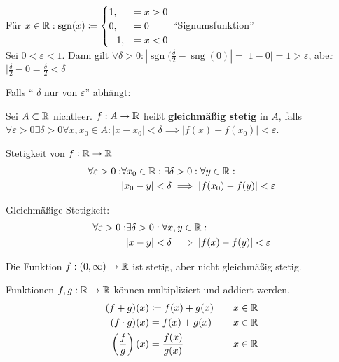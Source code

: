 \begin{subexample}
	Für $ x \in \mathbb{R} : \operatorname{sgn}(x) \coloneqq \begin{cases}
		1, &= x > 0 \\
		0, &= 0 \\
		-1, &= x < 0 \\
	\end{cases} $ ``Signumsfunktion''\\
	Sei $ 0 < \varepsilon < 1 $. Dann gilt $ \forall \delta > 0: | \operatorname{sgn}(\frac{ \delta }{ 2 } - \operatorname{sng}(0) | = | 1 - 0 | = 1 > \varepsilon  $, aber $ | \frac{ \delta }{ 2 } - 0 = \frac{ \delta }{ 2 } < \delta $
\end{subexample}
Falls `` $ \delta $ nur von $ \varepsilon  $'' abhängt:
\begin{subdefinition}
	Sei $ A \subset \mathbb{R}  $ nichtleer. $ f: A \to \mathbb{R}  $ heißt \textbf{gleichmäßig stetig} in $ A $, falls\\
	$ \forall \varepsilon > 0\exists \delta > 0 \forall x, x_0 \in A : | x - x_0 | < \delta \implies  |f(x) - f(x_0) | < \varepsilon  $.
\end{subdefinition}


Stetigkeit von $ f: \mathbb{R}  \to \mathbb{R}  $ 
\begin{align*}
	\forall \varepsilon > 0 : &\forall x_0 \in \mathbb{R} : \exists \delta > 0 : \forall y \in \mathbb{R} :\\
	~& | x_0 - y | < \delta \implies |f(x_0) - f(y) | < \varepsilon 
\end{align*}

Gleichmäßige Stetigkeit:
\begin{align*}
	\forall \varepsilon > 0: &\exists \delta > 0 :\forall x, y \in \mathbb{R} :\\
	~&| x - y | < \delta \implies | f(x) - f(y) | < \varepsilon 
\end{align*}

\begin{subexample}
	Die Funktion $ f: (0, \infty) \to \mathbb{R}  $ ist stetig, aber nicht gleichmäßig stetig.
\end{subexample}

Funktionen $ f,g: \mathbb{R} \to \mathbb{R}  $ können multipliziert und addiert werden.
\begin{alignat*}{3}
	(f + g)(x) &\coloneqq f(x) + g(x) && \quad x \in \mathbb{R} \\
	(f \cdot g)(x) &= f(x) + g(x) && \quad x \in \mathbb{R} \\
	\left ( \frac{ f }{ g }  \right) (x) &= \frac{ f(x) }{ g(x) } && \quad x \in \mathbb{R}  \\
\end{alignat*}

